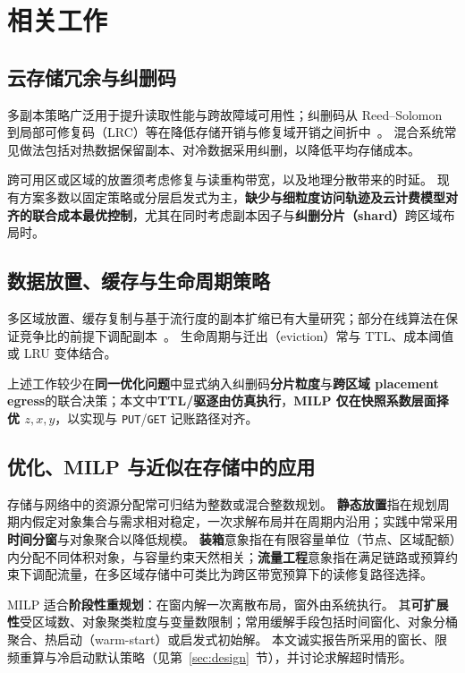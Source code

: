 \documentclass[conference]{IEEEtran}
\begin{document}
\section{相关工作}
\label{sec:related}

\subsection{云存储冗余与纠删码}
多副本策略广泛用于提升读取性能与跨故障域可用性；纠删码从 Reed--Solomon 到局部可修复码（LRC）等在降低存储开销与修复域开销之间折中~\cite{ref_placeholder}。
混合系统常见做法包括对热数据保留副本、对冷数据采用纠删，以降低平均存储成本。

跨可用区或区域的放置须考虑修复与读重构带宽，以及地理分散带来的时延。
现有方案多数以固定策略或分层启发式为主，\textbf{缺少与细粒度访问轨迹及云计费模型对齐的联合成本最优控制}，尤其在同时考虑副本因子与\textbf{纠删分片（shard）}跨区域布局时。

\subsection{数据放置、缓存与生命周期策略}
多区域放置、缓存复制与基于流行度的副本扩缩已有大量研究；部分在线算法在保证竞争比的前提下调配副本~\cite{ref_placeholder}。
生命周期与迁出（eviction）常与 TTL、成本阈值或 LRU 变体结合。

上述工作较少在\textbf{同一优化问题}中显式纳入纠删码\textbf{分片粒度}与\textbf{跨区域 placement egress}的联合决策；本文中\textbf{TTL/驱逐由仿真执行}，\textbf{MILP 仅在快照系数层面择优 $z,x,y$}，以实现与 \texttt{PUT}/\texttt{GET} 记账路径对齐。

\subsection{优化、MILP 与近似在存储中的应用}
存储与网络中的资源分配常可归结为整数或混合整数规划。
\textbf{静态放置}指在规划周期内假定对象集合与需求相对稳定，一次求解布局并在周期内沿用；实践中常采用\textbf{时间分窗}与对象聚合以降低规模。
\textbf{装箱}意象指在有限容量单位（节点、区域配额）内分配不同体积对象，与容量约束天然相关；\textbf{流量工程}意象指在满足链路或预算约束下调配流量，在多区域存储中可类比为跨区带宽预算下的读修复路径选择。

MILP 适合\textbf{阶段性重规划}：在窗内解一次离散布局，窗外由系统执行。
其\textbf{可扩展性}受区域数、对象聚类粒度与变量数限制；常用缓解手段包括时间窗化、对象分桶聚合、热启动（warm-start）或启发式初始解。
本文诚实报告所采用的窗长、限频重算与冷启动默认策略（见第~\ref{sec:design}~节），并讨论求解超时情形。
\end{document}
